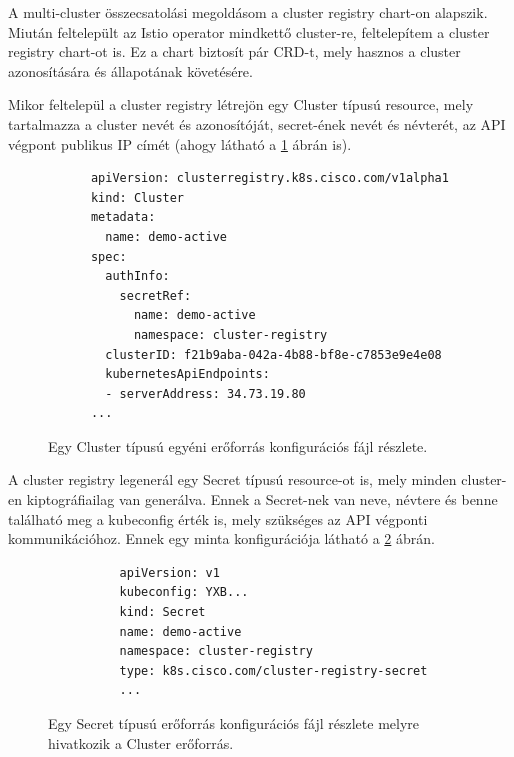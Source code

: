 A multi-cluster összecsatolási megoldásom a cluster registry chart-on alapszik.
Miután feltelepült az Istio operator mindkettő cluster-re, feltelepítem a cluster registry chart-ot is.
Ez a chart biztosít pár CRD-t, mely hasznos a cluster azonosítására és állapotának követésére.

Mikor feltelepül a cluster registry létrejön egy Cluster típusú resource, mely tartalmazza a cluster nevét és azonosítóját, secret-ének nevét és névterét, az API végpont publikus IP címét (ahogy látható a \ref{sample-cluster-config} ábrán is).

\begin{figure}
  \centering
  \begin{minipage}{\linewidth}
    \begin{lstlisting}
      apiVersion: clusterregistry.k8s.cisco.com/v1alpha1
      kind: Cluster
      metadata:
        name: demo-active
      spec:
        authInfo:
          secretRef:
            name: demo-active
            namespace: cluster-registry
        clusterID: f21b9aba-042a-4b88-bf8e-c7853e9e4e08
        kubernetesApiEndpoints:
        - serverAddress: 34.73.19.80
      ...
    \end{lstlisting}
    \end{minipage}
    \caption{Egy Cluster típusú egyéni erőforrás konfigurációs fájl részlete.}
    \label{sample-cluster-config}
\end{figure}

A cluster registry legenerál egy Secret típusú resource-ot is, mely minden cluster-en kiptográfiailag van generálva.
Ennek a Secret-nek van neve, névtere és benne található meg a kubeconfig érték is, mely szükséges az API végponti kommunikációhoz.
Ennek egy minta konfigurációja látható a \ref{sample-secret-config} ábrán.

\begin{figure}
  \centering
  \begin{minipage}{\linewidth}
      \begin{lstlisting}
          apiVersion: v1
          kubeconfig: YXB...
          kind: Secret
          name: demo-active
          namespace: cluster-registry
          type: k8s.cisco.com/cluster-registry-secret
          ...
      \end{lstlisting}
  \end{minipage}
  \caption{Egy Secret típusú erőforrás konfigurációs fájl részlete melyre hivatkozik a Cluster erőforrás.}
    \label{sample-secret-config}
\end{figure}

